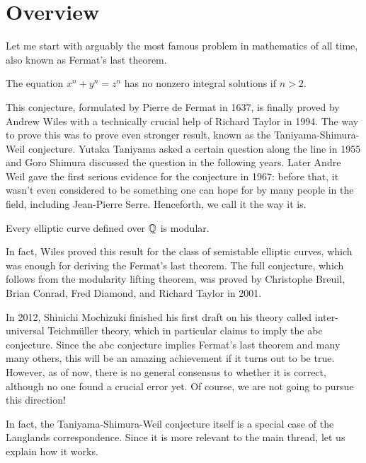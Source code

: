 \section{Overview}

Let me start with arguably the most famous problem in mathematics of all time, also known as Fermat's last theorem. 

\begin{conj}
The equation $x^n+y^n=z^n$ has no nonzero integral solutions if $n>2$.
\end{conj}

This conjecture, formulated by Pierre de Fermat in 1637, is finally proved by Andrew Wiles with a technically crucial help of Richard Taylor in 1994. The way to prove this was to prove even stronger result, known as the Taniyama-Shimura-Weil conjecture. Yutaka Taniyama asked a certain question along the line in 1955 and Goro Shimura discussed the question in the following years. Later Andre Weil gave the first serious evidence for the conjecture in 1967: before that, it wasn't even considered to be something one can hope for by many people in the field, including Jean-Pierre Serre. Henceforth, we call it the way it is.

\begin{conj}
Every elliptic curve defined over $\mathbb{Q}$ is modular.
\end{conj}

In fact, Wiles proved this result for the class of semistable elliptic curves, which was enough for deriving the Fermat's last theorem. The full conjecture, which follows from the modularity lifting theorem, was proved by Christophe Breuil, Brian Conrad, Fred Diamond, and Richard Taylor in 2001. 

\begin{rem*}
In 2012, Shinichi Mochizuki finished his first draft on his theory called inter-universal Teichm\"uller theory, which in particular claims to imply the abc conjecture. Since the abc conjecture implies Fermat's last theorem and many many others, this will be an amazing achievement if it turns out to be true. However, as of now, there is no general consensus to whether it is correct, although no one found a crucial error yet. Of course, we are not going to pursue this direction!
\end{rem*}

In fact, the Taniyama-Shimura-Weil conjecture itself is a special case of the Langlands correspondence. Since it is more relevant to the main thread, let us explain how it works.\\

